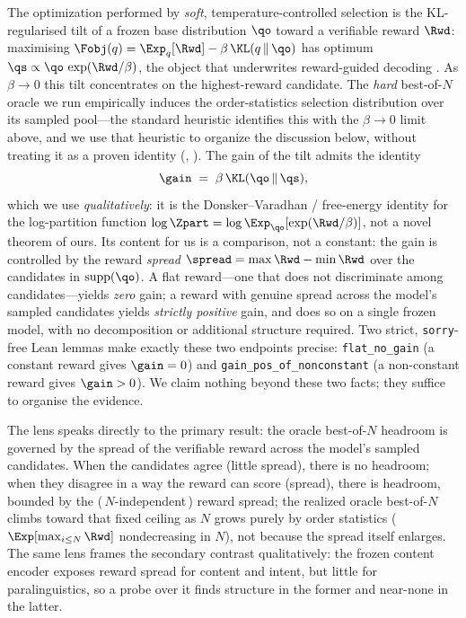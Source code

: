 The optimization performed by \emph{soft}, temperature-controlled selection is the KL-regularised tilt of a frozen base distribution $\qo$ toward a verifiable reward $\Rwd$: maximising $\Fobj(q)=\Exp_{q}[\Rwd]-\beta\,\KL(q\,\|\,\qo)$ has optimum $\qs \propto \qo\,\exp(\Rwd/\beta)$, the object that underwrites reward-guided decoding \citep{korbak2022kl,mudgal2024controlled,beirami2024bon}. As $\beta\!\to\!0$ this tilt concentrates on the highest-reward candidate. The \emph{hard} best-of-$N$ oracle we run empirically induces the order-statistics selection distribution over its sampled pool---the standard heuristic identifies this with the $\beta\to0$ limit above, and we use that heuristic to organize the discussion below, without treating it as a proven identity (, ). The gain of the tilt admits the identity
\[
  \gain \;=\; \beta\,\KL(\qo\,\|\,\qs),
\]
which we use \emph{qualitatively}: it is the Donsker--Varadhan / free-energy identity for the log-partition function $\log\Zpart=\log\Exp_{\qo}[\exp(\Rwd/\beta)]$, not a novel theorem of ours. Its content for us is a comparison, not a constant: the gain is controlled by the reward \emph{spread} $\spread=\max\Rwd-\min\Rwd$ over the candidates in $\mathrm{supp}(\qo)$. A flat reward---one that does not discriminate among candidates---yields \emph{zero} gain; a reward with genuine spread across the model's sampled candidates yields \emph{strictly positive} gain, and does so on a single frozen model, with no decomposition or additional structure required. Two strict, \texttt{sorry}-free Lean lemmas make exactly these two endpoints precise: \texttt{flat\_no\_gain} (a constant reward gives $\gain=0$) and \texttt{gain\_pos\_of\_nonconstant} (a non-constant reward gives $\gain>0$). We claim nothing beyond these two facts; they suffice to organise the evidence.

The lens speaks directly to the primary result: the oracle best-of-$N$ headroom is governed by the spread of the verifiable reward across the model's sampled candidates. When the candidates agree (little spread), there is no headroom; when they disagree in a way the reward can score (spread), there is headroom, bounded by the (\,$N$-independent\,) reward spread; the realized oracle best-of-$N$ climbs toward that fixed ceiling as $N$ grows purely by order statistics ($\Exp[\max_{i\le N}\Rwd]$ nondecreasing in $N$), not because the spread itself enlarges. The same lens frames the secondary contrast qualitatively: the frozen content encoder exposes reward spread for content and intent, but little for paralinguistics, so a probe over it finds structure in the former and near-none in the latter.

